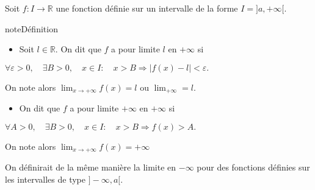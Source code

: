 \documentclass[letterpaper,10pt,french]{jupyterBook}
\begin{document}
\sphinxAtStartPar
Soit \(f:I\rightarrow\mathbb{R}\) une fonction définie sur un intervalle de la forme \(I=]a,+\infty[.\)

\begin{sphinxadmonition}{note}{Définition}
\begin{itemize}
\item {} 
\sphinxAtStartPar
Soit \(l\in \mathbb{R}.\) On dit que \(f\) a pour limite \(l\) en \(+\infty\) si

\end{itemize}

\sphinxAtStartPar
\(\forall \varepsilon>0,\quad \exists B>0, \quad x\in I:\quad x> B\Rightarrow |f(x)-l|<\varepsilon.\)

\sphinxAtStartPar
On note alors \(\lim_{x\rightarrow +\infty}f(x)=l\) ou \(\lim_{+\infty}=l.\)
\begin{itemize}
\item {} 
\sphinxAtStartPar
On dit que \(f\) a pour limite \(+\infty\) en \(+\infty\) si

\end{itemize}

\sphinxAtStartPar
\(\forall A>0,\quad \exists B>0, \quad x\in I:\quad x> B\Rightarrow f(x)>A.\)

\sphinxAtStartPar
On note alors \(\lim_{x\rightarrow +\infty}f(x)=+\infty\)

\sphinxAtStartPar
On définirait de la même manière la limite en \(-\infty\) pour des fonctions définies sur les intervalles de type \(]-\infty,a[.\)
\end{sphinxadmonition}
\end{document}
